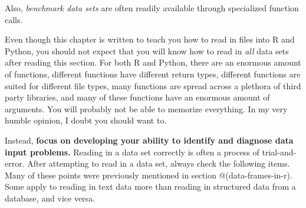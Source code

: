 \documentclass[
  12pt,
  krantz2]{krantz}
\begin{document}
Also, \emph{benchmark data sets} are often readily available through specialized function calls.

Even though this chapter is written to teach you how to read in files into R and Python, you should not expect that you will know how to read in \emph{all} data sets after reading this section. For both R and Python, there are an enormous amount of functions, different functions have different return types, different functions are suited for different file types, many functions are spread across a plethora of third party libraries, and many of these functions have an enormous amount of arguments. You will probably not be able to memorize everything. In my very humble opinion, I doubt you should want to.

Instead, \textbf{focus on developing your ability to identify and diagnose data input problems.} Reading in a data set correctly is often a process of trial-and-error. After attempting to read in a data set, always check the following items. Many of these points were previously mentioned in section @(data-frames-in-r). Some apply to reading in text data more than reading in structured data from a database, and vice versa.
\end{document}

